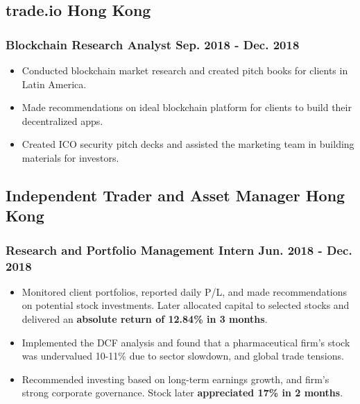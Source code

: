 \documentclass{article}
\begin{document}
\vspace{-1.6mm}

\subsection{trade.io \hspace{5.85in} Hong Kong}
\subsubsection{Blockchain Research Analyst \hspace{4.3in} Sep. 2018 - Dec. 2018}
\vspace{-2.9mm}
\begin{itemize}[noitemsep]
\item Conducted blockchain market research and created pitch books for clients in Latin America.
\item Made recommendations on ideal blockchain platform for clients to build their decentralized apps.
\item Created ICO security pitch decks and assisted the marketing team in building materials for investors.
\end{itemize}

\vspace{-1.6mm}

\subsection{Independent Trader and Asset Manager \hspace{3.3in} Hong Kong}
\subsubsection{Research and Portfolio Management Intern \hspace{3.5in} Jun. 2018 - Dec. 2018}
\vspace{-2.9mm}
\begin{itemize}[noitemsep]
\item Monitored client portfolios, reported daily P/L, and made recommendations on potential stock investments. Later
allocated capital to selected stocks and delivered an \textbf{absolute return of 12.84\% in 3 months}.
\item Implemented the DCF analysis and found that a pharmaceutical firm’s stock was undervalued 10-11\% due to sector
slowdown, and global trade tensions.
\item Recommended investing based on long-term earnings growth, and firm’s strong corporate governance. Stock later
\textbf{appreciated 17\% in 2 months}.
\end{itemize}
\end{document}

